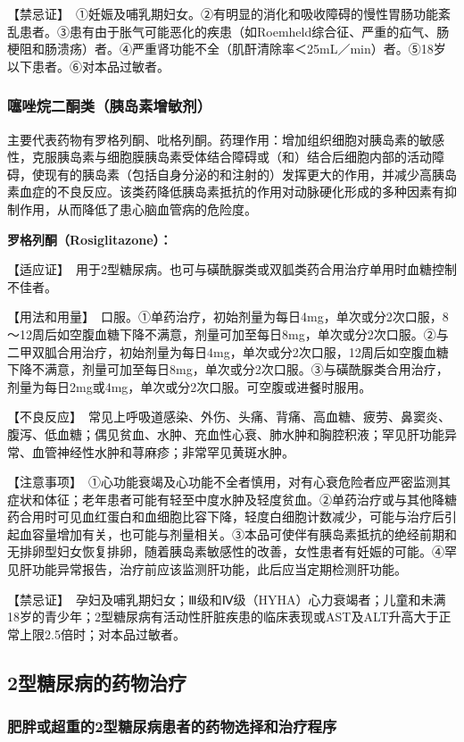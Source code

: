 【禁忌证】　①妊娠及哺乳期妇女。②有明显的消化和吸收障碍的慢性胃肠功能紊乱患者。③患有由于胀气可能恶化的疾患（如Roemheld综合征、严重的疝气、肠梗阻和肠溃疡）者。④严重肾功能不全（肌酐清除率＜25mL／min）者。⑤18岁以下患者。⑥对本品过敏者。

\subsubsection{噻唑烷二酮类（胰岛素增敏剂）}

主要代表药物有罗格列酮、吡格列酮。药理作用：增加组织细胞对胰岛素的敏感性，克服胰岛素与细胞膜胰岛素受体结合障碍或（和）结合后细胞内部的活动障碍，使现有的胰岛素（包括自身分泌的和注射的）发挥更大的作用，并减少高胰岛素血症的不良反应。该类药降低胰岛素抵抗的作用对动脉硬化形成的多种因素有抑制作用，从而降低了患心脑血管病的危险度。

\textbf{罗格列酮（Rosiglitazone）：}

【适应证】　用于2型糖尿病。也可与磺酰脲类或双胍类药合用治疗单用时血糖控制不佳者。

【用法和用量】　口服。①单药治疗，初始剂量为每日4mg，单次或分2次口服，8～12周后如空腹血糖下降不满意，剂量可加至每日8mg，单次或分2次口服。②与二甲双胍合用治疗，初始剂量为每日4mg，单次或分2次口服，12周后如空腹血糖下降不满意，剂量可加至每日8mg，单次或分2次口服。③与磺酰脲类合用治疗，剂量为每日2mg或4mg，单次或分2次口服。可空腹或进餐时服用。

【不良反应】　常见上呼吸道感染、外伤、头痛、背痛、高血糖、疲劳、鼻窦炎、腹泻、低血糖；偶见贫血、水肿、充血性心衰、肺水肿和胸腔积液；罕见肝功能异常、血管神经性水肿和荨麻疹；非常罕见黄斑水肿。

【注意事项】　①心功能衰竭及心功能不全者慎用，对有心衰危险者应严密监测其症状和体征；老年患者可能有轻至中度水肿及轻度贫血。②单药治疗或与其他降糖药合用时可见血红蛋白和血细胞比容下降，轻度白细胞计数减少，可能与治疗后引起血容量增加有关，也可能与剂量相关。③本品可使伴有胰岛素抵抗的绝经前期和无排卵型妇女恢复排卵，随着胰岛素敏感性的改善，女性患者有妊娠的可能。④罕见肝功能异常报告，治疗前应该监测肝功能，此后应当定期检测肝功能。

【禁忌证】　孕妇及哺乳期妇女；Ⅲ级和Ⅳ级（HYHA）心力衰竭者；儿童和未满18岁的青少年；2型糖尿病有活动性肝脏疾患的临床表现或AST及ALT升高大于正常上限2.5倍时；对本品过敏者。

\subsection{2型糖尿病的药物治疗}

\subsubsection{肥胖或超重的2型糖尿病患者的药物选择和治疗程序}

